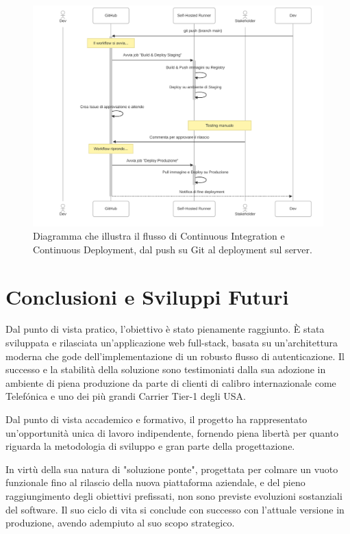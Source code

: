\documentclass[12pt,a4paper,openright,twoside]{book}
\begin{document}
\begin{figure}[htbp]
    \centering
    \includegraphics[width=\textwidth]{figures/pipeline_sequence.pdf}
    \caption{Diagramma che illustra il flusso di Continuous Integration e Continuous Deployment, dal push su Git al deployment sul server.}
    \label{fig:ci_cd_diagram}
\end{figure}
\FloatBarrier


\chapter{Conclusioni e Sviluppi Futuri}
\label{chap:conclusioni}

Dal punto di vista pratico, l'obiettivo è stato pienamente raggiunto. È stata sviluppata e rilasciata un'applicazione web full-stack, basata su un'architettura moderna che gode dell'implementazione di un robusto flusso di autenticazione. Il successo e la stabilità della soluzione sono testimoniati dalla sua adozione in ambiente di piena produzione da parte di clienti di calibro internazionale come Telefónica e uno dei più grandi Carrier Tier-1 degli USA.

Dal punto di vista accademico e formativo, il progetto ha rappresentato un'opportunità unica di lavoro indipendente, fornendo piena libertà per quanto riguarda la metodologia di sviluppo e gran parte della progettazione.

In virtù della sua natura di "soluzione ponte", progettata per colmare un vuoto funzionale fino al rilascio della nuova piattaforma aziendale, e del pieno raggiungimento degli obiettivi prefissati, non sono previste evoluzioni sostanziali del software. Il suo ciclo di vita si conclude con successo con l'attuale versione in produzione, avendo adempiuto al suo scopo strategico.


\backmatter




\end{document}
